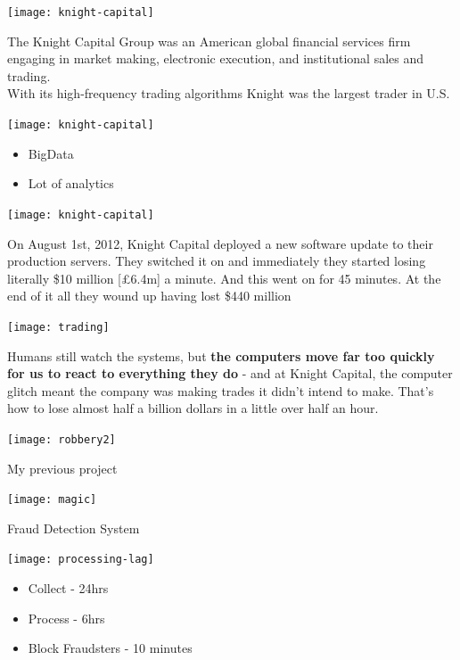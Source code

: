 \documentclass[aspectratio=169, 15pt,usenames,dvipsnames]{beamer}
\begin{document}
\begin{gdsw}
	\centering\texttt{[image: knight-capital]} 
	\par
	The Knight Capital Group was an American global financial services firm engaging in market making, electronic execution, and institutional sales and trading.\\
	With its high-frequency trading algorithms Knight was the largest trader in U.S.        
\end{gdsw}
\begin{gdsw}
	\centering\texttt{[image: knight-capital]} 
	\par
	\begin{itemize}
		\item BigData
		\item Lot of analytics
	\end{itemize}
\end{gdsw}
\begin{gdsw}
	\centering\texttt{[image: knight-capital]} 
	\par
	On August 1st, 2012, Knight Capital deployed a new software update to their production servers.
	They switched it on and immediately they started losing literally \$10 million [£6.4m] a minute.
	And this went on for 45 minutes. At the end of it all they wound up having lost \$440 million
\end{gdsw}	
\begin{gdsw}
	\centering\texttt{[image: trading]} 
	\par
	Humans still watch the systems, but {\bf the computers move far too quickly for us to react to everything they do} - and at Knight Capital, the computer glitch meant the company was making trades it didn't intend to make. That's how to lose almost half a billion dollars in a little over half an hour.
\end{gdsw}
\begin{gdsw}
	\centering\texttt{[image: robbery2]} 
	\par
	\LARGE My previous project
\end{gdsw}
\begin{gdsw}
	\centering\texttt{[image: magic]} 
	\par
	\LARGE Fraud Detection System
\end{gdsw}
\begin{gdsw}
	\centering\texttt{[image: processing-lag]} 
	\par
	\begin{center}		
		\begin{itemize}
			\item Collect - 24hrs
			\item Process - 6hrs
			\item Block Fraudsters - 10 minutes
		\end{itemize}
	\end{center}
\end{gdsw}	
\end{document}
